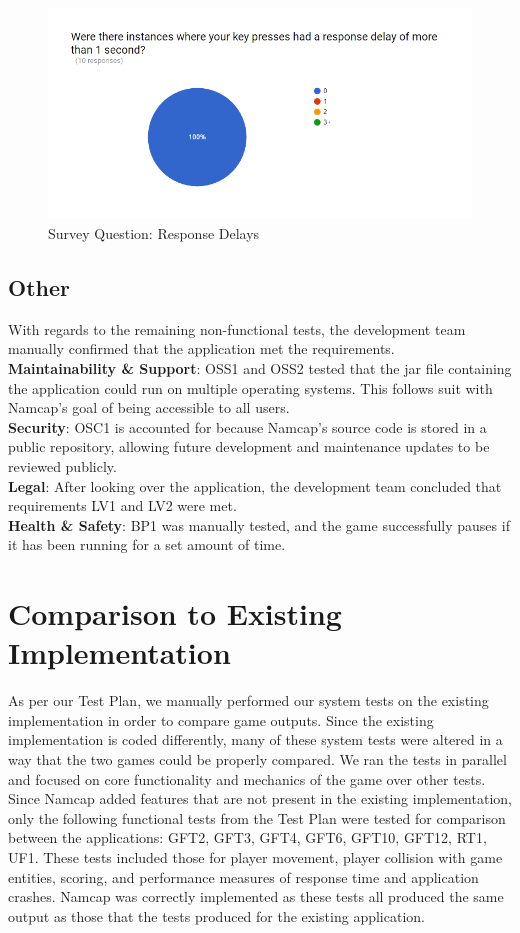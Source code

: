 \documentclass[12pt, titlepage]{article}
\begin{document}
\begin{figure}[H]
\centering
\includegraphics[width=1.0\textwidth]{SurveyQuestion10.png}
\caption{Survey Question: Response Delays}
\label{FigSQ10}
\end{figure}

\subsection{Other}

With regards to the remaining non-functional tests, the development team manually confirmed that the application met the requirements. \\
{\bf Maintainability \& Support}: OSS1 and OSS2 tested that the jar file containing the application could run on multiple operating systems. This follows suit with Namcap's goal of being accessible to all users.\\
{\bf Security}: OSC1 is accounted for because Namcap's source code is stored in a public repository, allowing future development and maintenance updates to be reviewed publicly.\\
{\bf Legal}: After looking over the application, the development team concluded that requirements LV1 and LV2 were met.\\
{\bf Health \& Safety}: BP1 was manually tested, and the game successfully pauses if it has been running for a set amount of time.
	
\section{Comparison to Existing Implementation}	

As per our Test Plan, we manually performed our system tests on the existing implementation in order to compare game outputs. Since the existing implementation is coded differently, many of these system tests were altered in a way that the two games could be properly compared. We ran the tests in parallel and focused on core functionality and mechanics of the game over other tests. Since Namcap added features that are not present in the existing implementation, only the following functional tests from the Test Plan were tested for comparison between the applications: GFT2, GFT3, GFT4, GFT6, GFT10, GFT12, RT1, UF1. These tests included those for player movement, player collision with game entities, scoring, and performance measures of response time and application crashes. Namcap was correctly implemented as these tests all produced the same output as those that the tests produced for the existing application.
\end{document}
